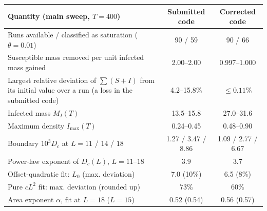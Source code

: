 \begin{tabular}{p{7.4cm}cc}
\toprule
Quantity (main sweep, $T = 400$) & Submitted code & Corrected code \\
\midrule
Runs available / classified as saturation ($\theta = 0.01$) & 90 / 59 & 90 / 66 \\
Susceptible mass removed per unit infected mass gained & 2.00--2.00 & 0.997--1.000 \\
Largest relative deviation of $\sum (S+I)$ from its initial value over a run (a loss in the submitted code) & 4.2--15.8\% & $\le 0.11\%$ \\
Infected mass $M_I(T)$ & 13.5--15.8 & 27.0--31.6 \\
Maximum density $I_{\max}(T)$ & 0.24--0.45 & 0.48--0.90 \\
Boundary $10^3 D_c$ at $L = 11$ / $14$ / $18$ & 1.27 / 3.47 / 8.86 & 1.09 / 2.77 / 6.67 \\
Power-law exponent of $D_c(L)$, $L = 11$--$18$ & 3.9 & 3.7 \\
Offset-quadratic fit: $L_0$ (max. deviation) & 7.0 (10\%) & 6.5 (8\%) \\
Pure $c L^2$ fit: max. deviation (rounded up) & 73\% & 60\% \\
Area exponent $\alpha$, fit at $L = 18$ ($L = 15$) & 0.52 (0.54) & 0.56 (0.57) \\
\bottomrule
\end{tabular}
